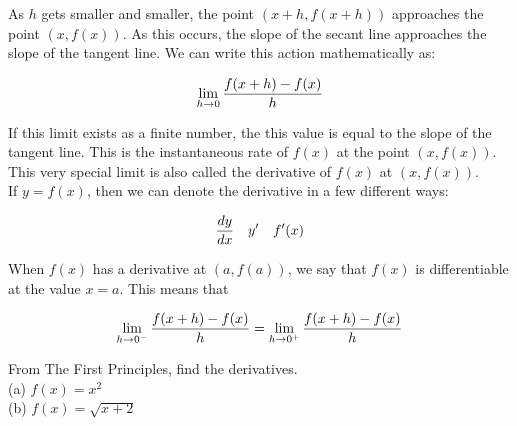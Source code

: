 As $ h $ gets smaller and smaller, the point $ (x+h, f(x+h)) $ approaches the point $ (x, f(x)) $. As this occurs, the slope of the secant line approaches the slope of the tangent line. We can write this action mathematically as: \\

\begin{theorem}
    \begin{align}
        \lim\limits_{h \rightarrow 0}{f(x+h) - f(x) \over h}
    \end{align}
\end{theorem}

If this limit exists as a finite number, the this value is equal to the slope of the tangent line. This is the instantaneous rate of $ f(x) $ at the point $ (x, f(x)) $. This very special limit is also called the derivative of $ f(x) $ at $ (x, f(x)) $. \\

If $ y = f(x) $, then we can denote the derivative in a few different ways:

\begin{align}\nonumber
    {dy \over dx} &  & y' &  & f'(x)
\end{align}

When $ f(x) $ has a derivative at $ (a, f(a)) $, we say that $ f(x) $ is differentiable at the value $ x = a $. This means that \\

\begin{theorem}
    \begin{align}
        \lim\limits_{h \rightarrow 0^-}{f(x+h) - f(x) \over h} = \lim\limits_{h \rightarrow 0^+}{f(x+h) - f(x) \over h}
    \end{align}
\end{theorem}

\begin{exercise}\nonumber
    From The First Principles, find the derivatives. \\

    (a) $ f(x) = x^2 $
    \vspace{7cm}
    \\

    (b) $ f(x) = \sqrt{x+2} $
    \vspace{9cm}
\end{exercise}

